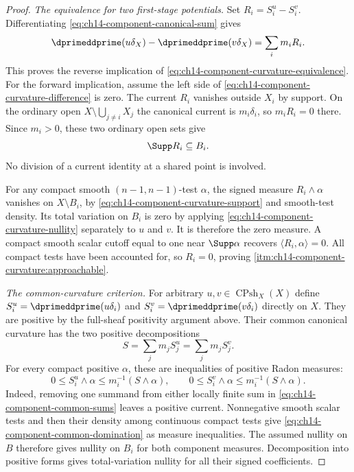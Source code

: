 \begin{proof}
\emph{The equivalence for two first-stage potentials.}
Set $R_i=S_i^u-S_i^v$.  Differentiating
\eqref{eq:ch14-component-canonical-sum} gives
\begin{equation}
 \dprimeddprime(u\delta_X)-\dprimeddprime(v\delta_X)
                              =\sum_i m_i R_i .
 \label{eq:ch14-component-curvature-difference}
\end{equation}
This proves the reverse implication of
\eqref{eq:ch14-component-curvature-equivalence}.
For the forward implication, assume the left side of
\eqref{eq:ch14-component-curvature-difference} is zero.
The current $R_i$ vanishes outside $X_i$ by support.  On the ordinary
open $X\setminus\bigcup_{j\ne i}X_j$ the canonical current is
$m_i\delta_i$, so $m_iR_i=0$ there.  Since $m_i>0$, these two ordinary
open sets give
\begin{equation}
                              \Supp R_i\subseteq B_i .
 \label{eq:ch14-component-curvature-support}
\end{equation}
No division of a current identity at a shared point is involved.

For any compact smooth $(n-1,n-1)$-test $\alpha$, the signed measure
$R_i\wedge\alpha$ vanishes on $X\setminus B_i$, by
\eqref{eq:ch14-component-curvature-support} and smooth-test density.
Its total variation on $B_i$ is zero by applying
\eqref{eq:ch14-component-curvature-nullity} separately to $u$ and $v$.
It is therefore the zero measure.  A compact smooth scalar cutoff equal
to one near $\Supp\alpha$ recovers
$\langle R_i,\alpha\rangle=0$.  All compact tests have been accounted for,
so $R_i=0$, proving
\cref{itm:ch14-component-curvature:approachable}.

\emph{The common-curvature criterion.}
For arbitrary $u,v\in\operatorname{CPsh}_X(X)$ define
$S_i^u=\dprimeddprime(u\delta_i)$ and
$S_i^v=\dprimeddprime(v\delta_i)$ directly on $X$.  They are positive by
the full-sheaf positivity argument above.  Their common canonical
curvature has the two positive decompositions
\begin{equation}
                 S=\sum_jm_jS_j^u=\sum_jm_jS_j^v .
 \label{eq:ch14-component-common-sums}
\end{equation}
For every compact positive $\alpha$, these are inequalities of positive
Radon measures:
\begin{equation}
 0\leq S_i^u\wedge\alpha\leq m_i^{-1}(S\wedge\alpha),
 \qquad
 0\leq S_i^v\wedge\alpha\leq m_i^{-1}(S\wedge\alpha).
 \label{eq:ch14-component-common-domination}
\end{equation}
Indeed, removing one summand from either locally finite sum in
\eqref{eq:ch14-component-common-sums} leaves a positive current.
Nonnegative smooth scalar tests and then their density among continuous
compact tests give \eqref{eq:ch14-component-common-domination} as measure
inequalities.  The assumed nullity on $B$ therefore gives nullity on
$B_i$ for both component measures.  Decomposition into positive forms
gives total-variation nullity for all their signed coefficients.


\end{proof}
